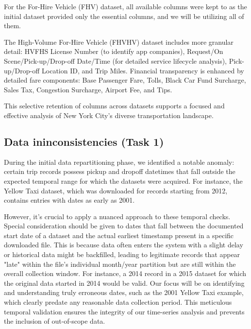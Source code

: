 \documentclass[conference]{IEEEtran}
\begin{document}
For the For-Hire Vehicle (FHV) dataset, all available columns were kept to as the initial dataset provided only the
essential columns, and we will be utilizing all of them.

The High-Volume For-Hire Vehicle (FHVHV) dataset includes more granular detail: HVFHS License Number (to identify app
companies), Request/On Scene/Pick-up/Drop-off Date/Time (for detailed service lifecycle analysis), Pick-up/Drop-off
Location ID, and Trip Miles. Financial transparency is enhanced by detailed fare components: Base Passenger Fare, Tolls,
Black Car Fund Surcharge, Sales Tax, Congestion Surcharge, Airport Fee, and Tips.

This selective retention of columns across datasets supports a focused and effective analysis of New York City's diverse
transportation landscape.

\subsection{Data ininconsistencies (Task 1)}
During the initial data repartitioning phase, we identified a notable anomaly: certain trip records possess pickup and
dropoff datetimes that fall outside the expected temporal range for which the datasets were acquired.
For instance, the Yellow Taxi dataset, which was downloaded for records starting from 2012, contains entries
with dates as early as 2001.

However, it's crucial to apply a nuanced approach to these temporal checks. Special consideration should be given to
dates that fall between the documented start date of a dataset and the actual earliest timestamp present in a specific
downloaded file. This is because data often enters the system with a slight delay or historical data might be backfilled,
leading to legitimate records that appear "late" within the file's individual month/year partition but are still within
the overall collection window. For instance, a 2014 record in a 2015 dataset for which the original data started in 2014
would be valid. Our focus will be on identifying and understanding truly erroneous dates, such as the 2001 Yellow Taxi
example, which clearly predate any reasonable data collection period. This meticulous temporal validation ensures the
integrity of our time-series analysis and prevents the inclusion of out-of-scope data.

\end{document}
